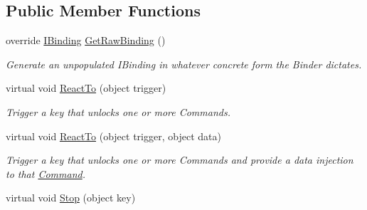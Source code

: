 \subsection*{Public Member Functions}
\begin{DoxyCompactItemize}
\item 
\hypertarget{classstrange_1_1extensions_1_1command_1_1impl_1_1_command_binder_a44d4f67e036ad79c90f95143e2972299}{override \hyperlink{interfacestrange_1_1framework_1_1api_1_1_i_binding}{I\-Binding} \hyperlink{classstrange_1_1extensions_1_1command_1_1impl_1_1_command_binder_a44d4f67e036ad79c90f95143e2972299}{Get\-Raw\-Binding} ()}\label{classstrange_1_1extensions_1_1command_1_1impl_1_1_command_binder_a44d4f67e036ad79c90f95143e2972299}

\begin{DoxyCompactList}\small\item\em Generate an unpopulated I\-Binding in whatever concrete form the Binder dictates. \end{DoxyCompactList}\item 
\hypertarget{classstrange_1_1extensions_1_1command_1_1impl_1_1_command_binder_a446f1cd5636b830764050fc472c38b51}{virtual void \hyperlink{classstrange_1_1extensions_1_1command_1_1impl_1_1_command_binder_a446f1cd5636b830764050fc472c38b51}{React\-To} (object trigger)}\label{classstrange_1_1extensions_1_1command_1_1impl_1_1_command_binder_a446f1cd5636b830764050fc472c38b51}

\begin{DoxyCompactList}\small\item\em Trigger a key that unlocks one or more Commands. \end{DoxyCompactList}\item 
\hypertarget{classstrange_1_1extensions_1_1command_1_1impl_1_1_command_binder_a40b47054aba067ba839f3927ea2aeff9}{virtual void \hyperlink{classstrange_1_1extensions_1_1command_1_1impl_1_1_command_binder_a40b47054aba067ba839f3927ea2aeff9}{React\-To} (object trigger, object data)}\label{classstrange_1_1extensions_1_1command_1_1impl_1_1_command_binder_a40b47054aba067ba839f3927ea2aeff9}

\begin{DoxyCompactList}\small\item\em Trigger a key that unlocks one or more Commands and provide a data injection to that \hyperlink{classstrange_1_1extensions_1_1command_1_1impl_1_1_command}{Command}. \end{DoxyCompactList}\item 
\hypertarget{classstrange_1_1extensions_1_1command_1_1impl_1_1_command_binder_a3e7ec542cbdfec1a78ce0583451b1565}{virtual void \hyperlink{classstrange_1_1extensions_1_1command_1_1impl_1_1_command_binder_a3e7ec542cbdfec1a78ce0583451b1565}{Stop} (object key)}\label{classstrange_1_1extensions_1_1command_1_1impl_1_1_command_binder_a3e7ec542cbdfec1a78ce0583451b1565}


\end{DoxyCompactItemize}

